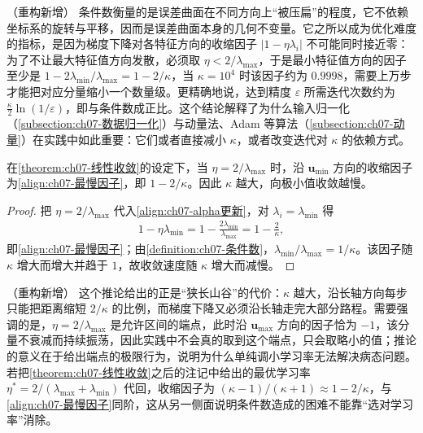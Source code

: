 \documentclass[../../main.tex]{subfiles}
\begin{document}
\begin{remark}（重构新增）
条件数衡量的是误差曲面在不同方向上“被压扁”的程度，它不依赖坐标系的旋转与平移，因而是误差曲面本身的几何不变量。它之所以成为优化难度的指标，是因为梯度下降对各特征方向的收缩因子 $|1-\eta\lambda_i|$ 不可能同时接近零：为了不让最大特征值方向发散，必须取 $\eta<2/\lambda_{\max}$，于是最小特征值方向的因子至少是 $1-2\lambda_{\min}/\lambda_{\max}=1-2/\kappa$，当 $\kappa=10^{4}$ 时该因子约为 $0.9998$，需要上万步才能把对应分量缩小一个数量级。更精确地说，达到精度 $\varepsilon$ 所需迭代次数约为 $\frac{\kappa}{2}\ln(1/\varepsilon)$，即与条件数成正比。这个结论解释了为什么输入归一化（\cref{subsection:ch07-数据归一化}）与动量法、Adam 等算法（\cref{subsection:ch07-动量}）在实践中如此重要：它们或者直接减小 $\kappa$，或者改变迭代对 $\kappa$ 的依赖方式。
\end{remark}

\begin{corollary}[最慢方向的收敛速度]\label{corollary:ch07-最慢方向}
在\cref{theorem:ch07-线性收敛}的设定下，当 $\eta=2/\lambda_{\max}$ 时，沿 $\mathbf{u}_{\min}$ 方向的收缩因子为\eqref{align:ch07-最慢因子}，即 $1-2/\kappa$。因此 $\kappa$ 越大，向极小值收敛越慢。
\end{corollary}
\begin{proof}
把 $\eta=2/\lambda_{\max}$ 代入\eqref{align:ch07-alpha更新}，对 $\lambda_i=\lambda_{\min}$ 得
\begin{align*}
1-\eta\lambda_{\min} = 1-\frac{2\lambda_{\min}}{\lambda_{\max}} = 1-\frac{2}{\kappa},
\end{align*}
即\eqref{align:ch07-最慢因子}；由\cref{definition:ch07-条件数}，$\lambda_{\min}/\lambda_{\max}=1/\kappa$。该因子随 $\kappa$ 增大而增大并趋于 $1$，故收敛速度随 $\kappa$ 增大而减慢。
\end{proof}

\begin{remark}（重构新增）
这个推论给出的正是“狭长山谷”的代价：$\kappa$ 越大，沿长轴方向每步只能把距离缩短 $2/\kappa$ 的比例，而梯度下降又必须沿长轴走完大部分路程。需要强调的是，$\eta=2/\lambda_{\max}$ 是允许区间的端点，此时沿 $\mathbf{u}_{\max}$ 方向的因子恰为 $-1$，该分量不衰减而持续振荡，因此实践中不会真的取到这个端点，只会取略小的值；推论的意义在于给出端点的极限行为，说明为什么单纯调小学习率无法解决病态问题。若把\cref{theorem:ch07-线性收敛}之后的注记中给出的最优学习率 $\eta^{\ast}=2/(\lambda_{\max}+\lambda_{\min})$ 代回，收缩因子为 $(\kappa-1)/(\kappa+1)\approx1-2/\kappa$，与\eqref{align:ch07-最慢因子}同阶，这从另一侧面说明条件数造成的困难不能靠“选对学习率”消除。
\end{remark}
\end{document}

